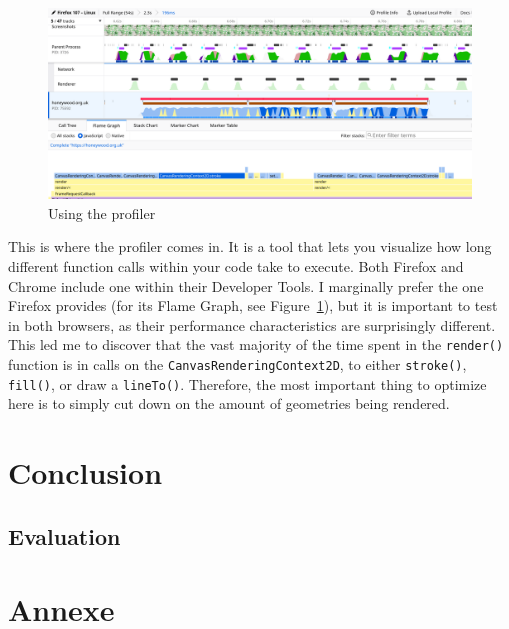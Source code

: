 \documentclass{final_report}
\begin{document}
\begin{figure}[ht]
    \centering
    \includegraphics[width=\textwidth]{../proof-of-concepts/4-rendering-osm-data/screenshots/profiling.png}
    \caption{Using the profiler}\label{fig:profiling}
\end{figure}

This is where the profiler comes in. It is a tool that lets you visualize how long different function calls within your code take to execute. Both Firefox and Chrome include one within their Developer Tools. I marginally prefer the one Firefox provides (for its Flame Graph, see Figure~\ref{fig:profiling}), but it is important to test in both browsers, as their performance characteristics are surprisingly different. This led me to discover that the vast majority of the time spent in the \texttt{render()} function is in calls on the \texttt{CanvasRenderingContext2D}, to either \texttt{stroke()}, \texttt{fill()}, or draw a \texttt{lineTo()}. Therefore, the most important thing to optimize here is to simply cut down on the amount of geometries being rendered.



\clearpage
\chapter{Conclusion}


\section{Evaluation}

\clearpage
\chapter{Annexe}



\renewcommand*{\bibfont}{\normalfont\small}
\printbibliography{}
\end{document}
